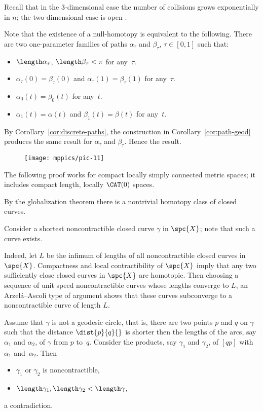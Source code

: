 Recall that in the 3-dimensional case the number of collisions grows exponentially in $n$; the two-dimensional case is open \cite{burago-ivanov}.

Note that the existence of a null-homotopy is equivalent to the following.
There are two one-parameter families of paths $\alpha_\tau$ and $\beta_\tau$, $\tau\in[0,1]$ 
such that: 
\begin{itemize}
\item $\length\alpha_\tau$, $\length\beta_\tau<\pi$ for any~$\tau$.
\item $\alpha_\tau(0)=\beta_\tau(0)$ and $\alpha_\tau(1)=\beta_\tau(1)$ for any~$\tau$.
\item $\alpha_0(t)=\beta_0(t)$ for any~$t$.
\item $\alpha_1(t)=\alpha(t)$ and $\beta_1(t)=\beta(t)$ for any~$t$.
\end{itemize}

By Corollary~\ref{cor:discrete-paths},
the construction in Corollary~\ref{cor:path-geod} produces the same result for $\alpha_\tau$ and $\beta_\tau$.
Hence the result.


\begin{wrapfigure}{r}{25 mm}
\vskip-4mm
\centering
\texttt{[image: mppics/pic-11]}
\end{wrapfigure}

The following proof works for compact locally simply connected metric spaces;
it includes compact length, locally $\CAT(0)$ spaces. 

\medskip


By the globalization theorem there is  a nontrivial homotopy class of closed curves.

Consider a shortest noncontractible closed curve $\gamma$ in  $\spc{X}$;
note that such a curve exists.

Indeed, let $L$ be the infimum of lengths of all noncontractible closed curves in $\spc{X}$.
Compactness and local contractibility of $\spc{X}$ imply that any two sufficiently close closed curves in $\spc{X}$ are homotopic.
Then choosing a sequence of unit speed noncontractible curves whose lengths converge to $L$, an Arzel\'{a}--Ascoli type of argument shows that these curves subconverge to a noncontractible curve of length $L$.


Assume that $\gamma$ is not a geodesic circle,
that is,  there are two points $p$ and $q$ on $\gamma$ such that the distance $\dist{p}{q}{}$ 
is shorter then the lengths of the arcs, say $\alpha_1$ and $\alpha_2$, of $\gamma$ from $p$ to~$q$.
Consider the products, say $\gamma_1$ and $\gamma_2$,
of $[qp]$ with $\alpha_1$ and~$\alpha_2$.
Then
\begin{itemize}
 \item  $\gamma_1$ or $\gamma_2$ is noncontractible,
 \item $\length\gamma_1, \length\gamma_2<\length \gamma$,
\end{itemize}
a contradiction.

